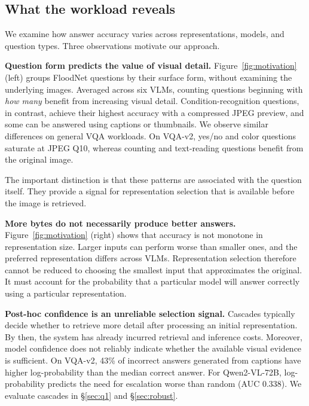 \documentclass[10pt,conference]{IEEEtran}
\newcommand{\mQSevTwo}{Qwen2-VL-72B\xspace}
\begin{document}
\subsection{What the workload reveals}
\label{sec:observe}



We examine how answer accuracy varies across representations, models, and question types. Three observations motivate our approach.

\textbf{Question form predicts the value of visual detail.}
Figure~\ref{fig:motivation} (left) groups FloodNet questions by their surface form, without examining the underlying images. Averaged across six VLMs, counting questions beginning with \emph{how many} benefit from increasing visual detail. Condition-recognition questions, in contrast, achieve their highest accuracy with a compressed JPEG preview, and some can be answered using captions or thumbnails. We observe similar differences on general VQA workloads. On VQA-v2, yes/no and color questions saturate at JPEG Q10, whereas counting and text-reading questions benefit from the original image.

The important distinction is that these patterns are associated with the question itself. They provide a signal for representation selection that is available before the image is retrieved.

\textbf{More bytes do not necessarily produce better answers.}
Figure~\ref{fig:motivation} (right) shows that accuracy is not monotone in representation size. Larger inputs can perform worse than smaller ones, and the preferred representation differs across VLMs. Representation selection therefore cannot be reduced to choosing the smallest input that approximates the original. It must account for the probability that a particular model will answer correctly using a particular representation.

\textbf{Post-hoc confidence is an unreliable selection signal.}
Cascades typically decide whether to retrieve more detail after processing an initial representation. By then, the system has already incurred retrieval and inference costs. Moreover, model confidence does not reliably indicate whether the available visual evidence is sufficient. On VQA-v2, 43\% of incorrect answers generated from captions have higher log-probability than the median correct answer. For \mQSevTwo, log-probability predicts the need for escalation worse than random (AUC 0.338). We evaluate cascades in \S\ref{sec:q1} and \S\ref{sec:robust}.
\end{document}
